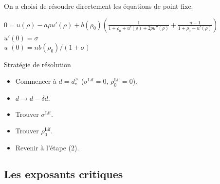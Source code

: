 \documentclass[xcolor=dvipsnames]{beamer}
\begin{document}
\begin{frame}
On a choisi de résoudre directement les équations de point fixe. 
\begin{block}{}
$0 = u(\rho) - a  \rho u'(\rho) + b(\rho_0) \left( \frac{1}{1 + \rho_0 + u'(\rho) + 2 \rho u''(\rho)} + \frac{n-1}{1+\rho_0+u'(\rho)} \right)$ \\
$u'(0) = \sigma$ \\
$u\phantom{'}(0) = n b(\rho_0)/(1+\sigma)$
\end{block}

\begin{block}{Stratégie de résolution}
\begin{itemize}
\item Commencer à $d=d_c^>$ ($\sigma^\text{Lif} = 0$, $\rho^\text{Lif}_{0} = 0$).
\item $d \rightarrow d - \delta d$. 
\item Trouver $\sigma^\text{Lif}$.
\item Trouver $\rho^\text{Lif}_{0}$.
\item Revenir à l'étape (2).
\end{itemize}
\end{block}

\end{frame}

\subsection{Les exposants critiques}
\end{document}
